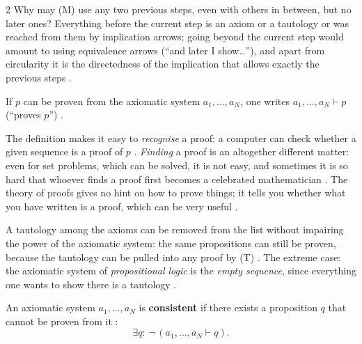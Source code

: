 \begin{paracol}{2}
Why may (M) use any two previous steps, even with others in between, but no later ones? Everything before the
current step is an axiom or a tautology or was reached from them by implication arrows; going beyond the current
step would amount to using equivalence arrows (``and later I show\dots''), and apart from circularity it is the
directedness of the implication that allows exactly the previous steps .

\begin{remark}[Notation]
If $p$ can be proven from the axiomatic system $a_1,\dots,a_N$, one writes $a_1,\dots,a_N\vdash p$ (``proves
$p$'') .
\end{remark}

\begin{remark}
The definition makes it easy to \emph{recognise} a proof: a computer can check whether a given sequence is a proof
of $p$ . \emph{Finding} a proof is an altogether different matter: even for set
problems, which can be solved, it is not easy, and sometimes it is so hard that whoever finds a proof first
becomes a celebrated mathematician . The theory of proofs gives no hint on how to prove things;
it tells you whether what you have written is a proof, which can be very useful .
\end{remark}

\begin{remark}\label{rem:lo-tautax}
A tautology among the axioms can be removed from the list without impairing the power of the axiomatic system:
the same propositions can still be proven, because the tautology can be pulled into any proof by (T)
. The extreme case: the axiomatic system of \emph{propositional logic} is the
\emph{empty sequence}, since everything one wants to show there is a tautology .
\end{remark}

\begin{definition}\label{def:lo-consistent}
An axiomatic system $a_1,\dots,a_N$ is \textbf{consistent} if there exists a proposition $q$ that cannot be proven
from it :
\[
  \exists q\colon\ \neg\,(a_1,\dots,a_N\vdash q).
\]
\end{definition}


\end{paracol}
